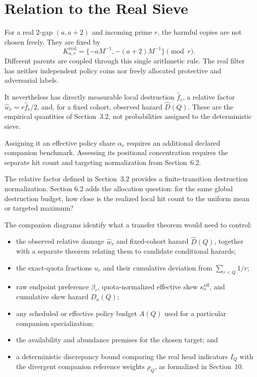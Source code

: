 \section{Relation to the Real Sieve}
For a real 2-gap $(a,a+2)$ and incoming prime $r$, the harmful copies are not chosen freely. They are fixed by
\begin{equation*}
K_{a,r}^{\mathrm{real}}
=
\{-aM^{-1},-(a+2)M^{-1}\}\pmod r.
\end{equation*}
Different parents are coupled through this single arithmetic rule. The real filter has neither independent policy coins nor freely allocated protective and adversarial labels.

It nevertheless has directly measurable local destruction $\widehat f_r$, a relative factor $\widehat w_r=r\widehat f_r/2$, and, for a fixed cohort, observed hazard $\widehat D(Q)$. These are the empirical quantities of Section~3.2, not probabilities assigned to the deterministic sieve.

Assigning it an effective policy share $\alpha_r$ requires an additional declared companion benchmark. Assessing its positional concentration requires the separate hit count and targeting normalization from Section~6.2.

The relative factor defined in Section~3.2 provides a finite-transition destruction normalization. Section 6.2 adds the allocation question: for the same global destruction budget, how close is the realized local hit count to the uniform mean or targeted maximum?

The companion diagrams identify what a transfer theorem would need to control:
\begin{itemize}
\item the observed relative damage $\widehat w_r$ and fixed-cohort hazard $\widehat D(Q)$, together with a separate theorem relating them to candidate conditional hazards;
\item the exact-quota fractions $u_r$ and their cumulative deviation from $\sum_{r < Q}1/r$;
\item raw endpoint preference $\beta_r$, quota-normalized effective skew $\kappa_r^{\mathrm{eff}}$, and cumulative skew hazard $D_{\kappa}(Q)$;
\item any scheduled or effective policy budget $A(Q)$ used for a particular companion specialization;
\item the availability and abundance premises for the chosen target; and
\item a deterministic discrepancy bound comparing the real head indicators $I_Q$ with the divergent companion reference weights $\rho_Q$, as formalized in Section~10.
\end{itemize}

